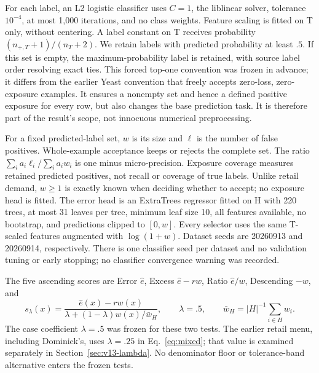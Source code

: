 For each label, an L2 logistic classifier uses $C=1$, the liblinear solver, tolerance $10^{-4}$, at most 1,000 iterations, and no class weights. Feature scaling is fitted on T only, without centering. A label constant on T receives probability $(n_{+,T}+1)/(n_T+2)$. We retain labels with predicted probability at least $.5$. If this set is empty, the maximum-probability label is retained, with source label order resolving exact ties. This forced top-one convention was frozen in advance; it differs from the earlier Yeast convention that freely accepts zero-loss, zero-exposure examples. It ensures a nonempty set and hence a defined positive exposure for every row, but also changes the base prediction task. It is therefore part of the result's scope, not innocuous numerical preprocessing.

For a fixed predicted-label set, $w$ is its size and $\ell$ is the number of false positives. Whole-example acceptance keeps or rejects the complete set. The ratio $\sum_i a_i\ell_i/\sum_i a_iw_i$ is one minus micro-precision. Exposure coverage measures retained predicted positives, not recall or coverage of true labels. Unlike retail demand, $w\geq1$ is exactly known when deciding whether to accept; no exposure head is fitted. The error head is an ExtraTrees regressor fitted on H with 220 trees, at most 31 leaves per tree, minimum leaf size 10, all features available, no bootstrap, and predictions clipped to $[0,w]$. Every selector uses the same T-scaled features augmented with $\log(1+w)$. Dataset seeds are 20260913 and 20260914, respectively. There is one classifier seed per dataset and no validation tuning or early stopping; no classifier convergence warning was recorded.

The five ascending scores are Error $\hat e$, Excess $\hat e-rw$, Ratio $\hat e/w$, Descending $-w$, and
\begin{equation}
 s_{\lambda}(x)=\frac{\hat e(x)-rw(x)}{\lambda+(1-\lambda)w(x)/\bar w_H},
 \qquad \lambda=.5,\qquad \bar w_H=|H|^{-1}\sum_{i\in H}w_i.
 \label{eq:v13-mixed}
\end{equation}
The case coefficient $\lambda=.5$ was frozen for these two tests. The earlier retail menu, including Dominick's, uses $\lambda=.25$ in Eq.~\ref{eq:mixed}; that value is examined separately in Section~\ref{sec:v13-lambda}. No denominator floor or tolerance-band alternative enters the frozen tests.

